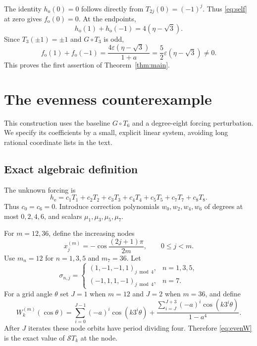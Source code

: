 \documentclass[11pt]{article}
\theoremstyle{remark}\newtheorem{remark}[theorem]{Remark}
\newcommand{\eps}{\varepsilon}
\begin{document}
The identity $h_{\mathrm{o}}(0)=0$ follows directly from
$T_{2j}(0)=(-1)^j$. Thus \eqref{eq:self} at zero gives
$f_{\mathrm{o}}(0)=0$. At the endpoints,
\[
 h_{\mathrm{o}}(1)+h_{\mathrm{o}}(-1)=4(\eta-\sqrt3).
\]
Since $T_3(\pm1)=\pm1$ and $G\circ T_3$ is odd,
\begin{equation}\label{eq:oddwitness}
 f_{\mathrm{o}}(1)+f_{\mathrm{o}}(-1)
 =\frac{4\eps(\eta-\sqrt3)}{1+a}
 =\frac52\eps(\eta-\sqrt3)\ne0.
\end{equation}
This proves the first assertion of Theorem~\ref{thm:main}.

\section{The evenness counterexample}

This construction uses the baseline $G\circ T_6$ and a degree-eight
forcing perturbation. We specify its coefficients by a small, explicit
linear system, avoiding long rational coordinate lists in the text.

\subsection{Exact algebraic definition}

The unknown forcing is
\[
 h_{\mathrm{e}}=c_1T_1+c_2T_2+c_3T_3+c_4T_4+c_5T_5+c_7T_7+c_8T_8.
\]
Thus $c_0=c_6=0$. Introduce correction polynomials
$w_0,w_2,w_4,w_6$ of degrees at most $0,2,4,6$, and scalars
$\mu_1,\mu_3,\mu_5,\mu_7$.

For $m=12,36$, define the increasing nodes
\[
 x_j^{(m)}=-\cos\frac{(2j+1)\pi}{2m},\qquad0\le j<m.
\]
Use $m_n=12$ for $n=1,3,5$ and $m_7=36$. Let
\[
 \sigma_{n,j}=\begin{cases}
 (1,-1,-1,1)_{j\bmod4},&n=1,3,5,\\
 (-1,1,1,-1)_{j\bmod4},&n=7.
 \end{cases}
\]
For a grid angle $\theta$ set $J=1$ when $m=12$ and $J=2$ when $m=36$,
and define
\begin{equation}\label{eq:evenW}
 W_k^{(m)}(\cos\theta)=
 \sum_{i=0}^{J-1}(-a)^i\cos(k3^i\theta)
 +\frac{\sum_{i=J}^{J+3}(-a)^i\cos(k3^i\theta)}{1-a^4}.
\end{equation}
After $J$ iterates these node orbits have period dividing four. Therefore
\eqref{eq:evenW} is the exact value of $\mathcal S T_k$ at the node.
\end{document}
